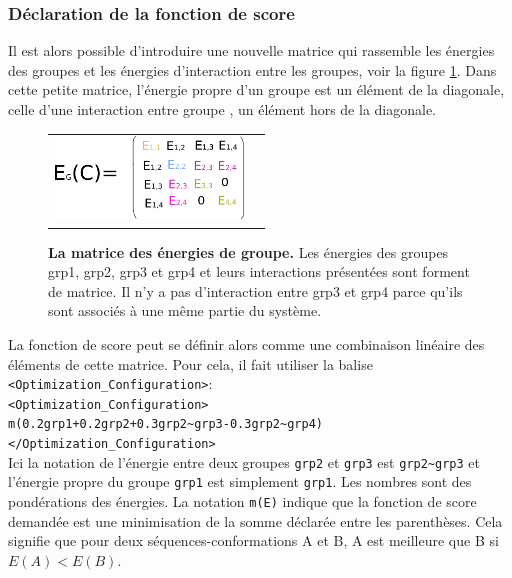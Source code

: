 \subsubsection{Déclaration de la fonction de score}
\label{sub:score}
Il est alors possible d'introduire une nouvelle matrice qui rassemble les énergies des groupes et les énergies d'interaction entre les groupes, voir la figure \ref{fig:group_matrix}. Dans cette petite matrice, l'énergie propre d'un groupe est un élément de la diagonale, celle d'une interaction entre groupe , un élément hors de la diagonale.



   \begin{figure}[!htbp]
     \centering
     \begin{tabular}{cc}
       \includegraphics[width=5cm]{figure/group_matrix.png} &
     \end{tabular}
     
     \caption{\textbf{La matrice des énergies de groupe.} Les énergies des groupes grp1, grp2, grp3 et grp4 et leurs interactions présentées sont forment de matrice. Il n'y a pas d'interaction entre grp3 et grp4 parce qu'ils sont associés à une même partie du système.}
\label{fig:group_matrix}
   \end{figure}

La fonction de score peut se définir alors comme une combinaison linéaire des éléments de cette matrice. Pour cela, il fait utiliser la balise  \verb!<Optimization_Configuration>!:\\
\verb!<Optimization_Configuration>! \\
\verb!m(0.2grp1+0.2grp2+0.3grp2~grp3-0.3grp2~grp4)! \\
\verb!</Optimization_Configuration>! \\


Ici la notation de l'énergie entre deux groupes \verb!grp2! et \verb!grp3! est \verb!grp2~grp3! et l'énergie propre du groupe \verb!grp1! est simplement \verb!grp1!. Les nombres sont des pondérations des énergies. La notation \verb!m(E)! indique que la fonction de score demandée est une minimisation de la somme déclarée entre les parenthèses. Cela signifie que pour deux séquences-conformations A et B, A est meilleure que B si $E(A) < E(B)$.


